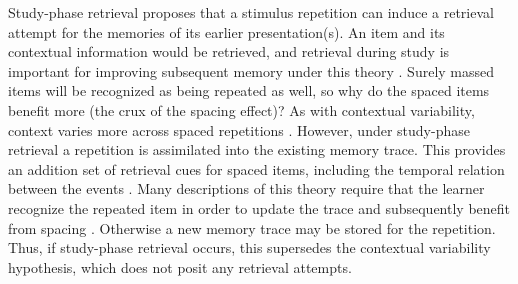 


\cbstart
Study-phase retrieval proposes that a stimulus repetition can induce a retrieval attempt for the memories of its earlier presentation(s).  An item and its contextual information would be retrieved, and retrieval during study is important for improving subsequent memory under this theory \cite{Gree1989a,ThioDAgo1976}.  Surely massed items will be recognized as being repeated as well, so why do the spaced items benefit more (the crux of the spacing effect)?  As with contextual variability, context varies more across spaced repetitions \cite{Melt1967}.  However, under study-phase retrieval a repetition is assimilated into the existing memory trace.  This provides an addition set of retrieval cues for spaced items, including the temporal relation between the events \cite{Gree1989a}.  Many descriptions of this theory require that the learner recognize the repeated item in order to update the trace and subsequently benefit from spacing \cite{HintBloc1973,HintEtal1975a,JohnUhl1976,Raai2003}.  Otherwise a new memory trace may be stored for the repetition.  Thus, if study-phase retrieval occurs, this supersedes the contextual variability hypothesis, which does not posit any retrieval attempts.
\cbend


